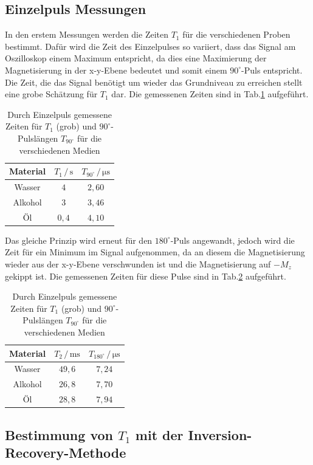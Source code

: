 \documentclass[numbers=noenddot,a4paper,notitlepage,twoside,BCOR15mm]{scrartcl}
\begin{document}
	\subsection{Einzelpuls Messungen}
	\label{kap:A1}
	In den erstem Messungen werden die Zeiten $T_1$ für die verschiedenen Proben bestimmt. Dafür wird die Zeit des Einzelpulses so variiert, dass das Signal am Oszilloskop einem Maximum entspricht, da dies eine Maximierung der Magnetisierung in der x-y-Ebene bedeutet und somit einem $90^\circ$-Puls entspricht. Die Zeit, die das Signal benötigt um wieder das Grundniveau zu erreichen stellt eine grobe Schätzung für $T_1$ dar. Die gemessenen Zeiten sind in Tab.\ref{tab:1Puls90} aufgeführt.
	\begin{table}[h]
		\centering
		\caption{Durch Einzelpuls gemessene Zeiten für $T_1$ (grob) und $90^\circ$-Pulslängen $T_{90^\circ}$ für die verschiedenen Medien}
		\begin{tabular}{c c c}
			Material & $T_1\,/\,\mathrm{s}$ &$ T_{90^\circ}\,/\,\mathrm{\mu s}$ \\ \hline
			Wasser 	& $4$   & $2,60$ \\
			Alkohol & $3$   & $3,46$ \\
			Öl 		& $0,4$ & $4,10$
		\end{tabular}
		\label{tab:1Puls90}
	\end{table}
	Das gleiche Prinzip wird erneut für den $180^\circ$-Puls angewandt, jedoch wird die Zeit für ein Minimum im Signal aufgenommen, da an diesem die Magnetisierung wieder aus der x-y-Ebene verschwunden ist und die Magnetisierung auf $-M_z$ gekippt ist. Die gemessenen Zeiten für diese Pulse sind in Tab.\ref{tab:1Puls180} aufgeführt.
		\begin{table}[h]
			\centering
			\caption{Durch Einzelpuls gemessene Zeiten für $T_1$ (grob) und $90^\circ$-Pulslängen $T_{90^\circ}$ für die verschiedenen Medien}
			\begin{tabular}{c c c}
				Material & $T_2\,/\,\mathrm{ms}$ &$ T_{180^\circ}\,/\,\mathrm{\mu s}$ \\ \hline
				Wasser 	& $49,6$ & $7,24$ \\
				Alkohol & $26,8$ & $7,70$ \\
				Öl 		& $28,8$ & $7,94$
			\end{tabular}
			\label{tab:1Puls180}
		\end{table}
	\newpage

	\subsection{Bestimmung von $T_1$ mit der Inversion-Recovery-Methode}
	
\end{document}
